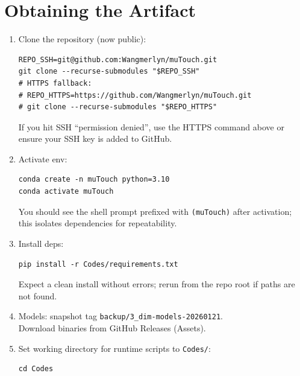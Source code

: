 \documentclass[conference]{IEEEtran}
\begin{document}
\section{Obtaining the Artifact}
\begin{enumerate}
  \item Clone the repository (now public):\\
  \begin{verbatim}
REPO_SSH=git@github.com:Wangmerlyn/muTouch.git
git clone --recurse-submodules "$REPO_SSH"
# HTTPS fallback:
# REPO_HTTPS=https://github.com/Wangmerlyn/muTouch.git
# git clone --recurse-submodules "$REPO_HTTPS"
  \end{verbatim}
  If you hit SSH ``permission denied'', use the HTTPS command above or ensure your SSH key is added to GitHub.
\item Activate env:\\
  \begin{verbatim}
conda create -n muTouch python=3.10
conda activate muTouch
  \end{verbatim}
  You should see the shell prompt prefixed with \texttt{(muTouch)} after activation; this isolates dependencies for repeatability.
\item Install deps:\\
  \begin{verbatim}
pip install -r Codes/requirements.txt
  \end{verbatim}
  Expect a clean install without errors; rerun from the repo root if paths are not found.
\item Models: snapshot tag \texttt{backup/3\_dim-models-20260121}.\\ Download binaries from GitHub Releases (Assets).
\item Set working directory for runtime scripts to \texttt{Codes/}:\\
  \begin{verbatim}
cd Codes
  \end{verbatim}
\end{enumerate}
\end{document}
